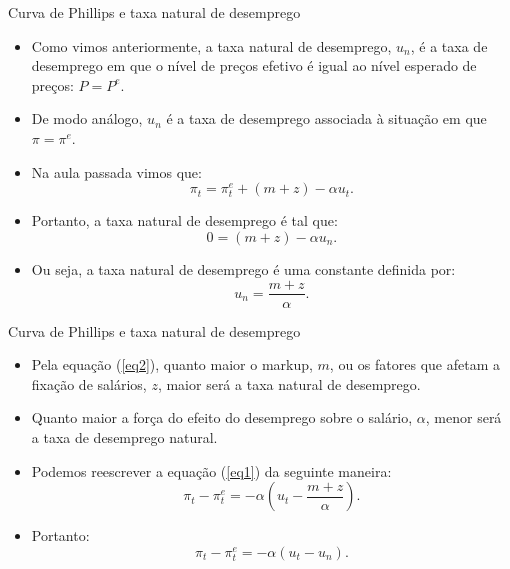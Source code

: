 \documentclass[10pt]{beamer}
\begin{document}
\begin{frame}{Curva de Phillips e taxa natural de desemprego}
    \begin{itemize}
        \item Como vimos anteriormente, a taxa natural de desemprego, $u_n$, é a taxa de desemprego em que o nível de preços efetivo é igual ao nível esperado de preços: $P = P^e$.
        \bigskip
        \item De modo análogo, $u_n$ é a taxa de desemprego associada à situação em que $\pi = \pi^e$.
        \bigskip
        \item Na aula passada vimos que:
        \begin{equation}
        \pi_t = \pi^e_t + (m + z) - \alpha u_t.
        \label{eq1}
        \end{equation}
        \bigskip
        \item Portanto, a taxa natural de desemprego é tal que:
        \begin{equation*}
            0 = (m + z) - \alpha u_n.
        \end{equation*}
        \bigskip
        \item Ou seja, a taxa natural de desemprego é uma constante definida por:
        \begin{equation}
            u_n = \frac{m + z}{\alpha}.
            \label{eq2}
        \end{equation}
    \end{itemize}
\end{frame}

\begin{frame}{Curva de Phillips e taxa natural de desemprego}
    \begin{itemize}
        \item Pela equação (\ref{eq2}), quanto maior o markup, $m$, ou os fatores que afetam a fixação de salários, $z$, maior será a taxa natural de desemprego.
        \bigskip
        \item Quanto maior a força do efeito do desemprego sobre o salário, $\alpha$, menor será a taxa de desemprego natural.
        \bigskip
        \item Podemos reescrever a equação (\ref{eq1}) da seguinte maneira:
        \[
        \pi_t - \pi^e_t = -\alpha \left(u_t - \frac{m + z}{\alpha}\right).
        \]
        \bigskip
        \item Portanto:
        \begin{equation}
            \pi_t - \pi^e_t = -\alpha (u_t - u_n).
            \label{eq3}
        \end{equation}
    \end{itemize}
\end{frame}
\end{document}

